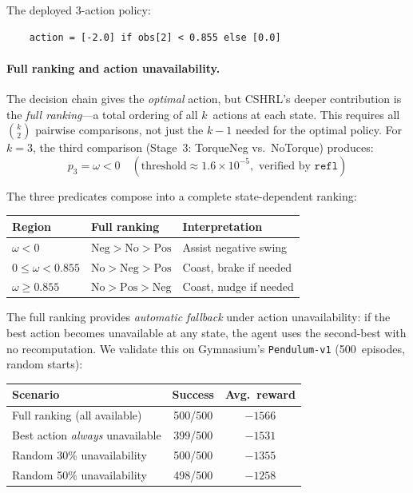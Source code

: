 \documentclass[9pt,a4paper]{article}
\theoremstyle{plain}
\theoremstyle{definition}
\theoremstyle{remark}
\begin{document}
The deployed 3-action policy:
\begin{verbatim}
    action = [-2.0] if obs[2] < 0.855 else [0.0]
\end{verbatim}

\paragraph{Full ranking and action unavailability.}
The decision chain gives the \emph{optimal} action, but CSHRL's deeper contribution is the \emph{full ranking}---a total ordering of all $k$~actions at each state.  This requires all $\binom{k}{2}$ pairwise comparisons, not just the $k{-}1$ needed for the optimal policy.  For $k=3$, the third comparison (Stage~3: TorqueNeg vs.\ NoTorque) produces:
\[
p_3 = \omega < 0 \quad (\text{threshold} \approx 1.6 \times 10^{-5}, \text{ verified by } \texttt{refl})
\]

\noindent The three predicates compose into a complete state-dependent ranking:
\begin{center}
\small
\begin{tabular}{@{}lll@{}}
\toprule
\textbf{Region} & \textbf{Full ranking} & \textbf{Interpretation} \\
\midrule
$\omega < 0$ & $\text{Neg} > \text{No} > \text{Pos}$ & Assist negative swing \\
$0 \leq \omega < 0.855$ & $\text{No} > \text{Neg} > \text{Pos}$ & Coast, brake if needed \\
$\omega \geq 0.855$ & $\text{No} > \text{Pos} > \text{Neg}$ & Coast, nudge if needed \\
\bottomrule
\end{tabular}
\end{center}

\noindent The full ranking provides \emph{automatic fallback} under action unavailability: if the best action becomes unavailable at any state, the agent uses the second-best with no recomputation.  We validate this on Gymnasium's \texttt{Pendulum-v1} (500~episodes, random starts):

\begin{center}
\small
\begin{tabular}{@{}lcc@{}}
\toprule
\textbf{Scenario} & \textbf{Success} & \textbf{Avg.\ reward} \\
\midrule
Full ranking (all available) & 500/500 & $-1566$ \\
Best action \emph{always} unavailable & 399/500 & $-1531$ \\
Random 30\% unavailability & 500/500 & $-1355$ \\
Random 50\% unavailability & 498/500 & $-1258$ \\
\bottomrule
\end{tabular}
\end{center}
\end{document}
